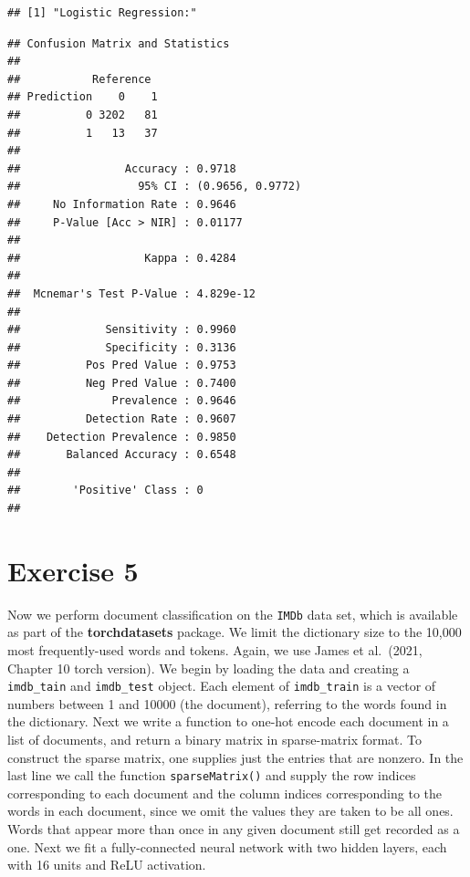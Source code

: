 \documentclass[
]{article}
\begin{document}
\begin{verbatim}
## [1] "Logistic Regression:"
\end{verbatim}

\begin{verbatim}
## Confusion Matrix and Statistics
## 
##           Reference
## Prediction    0    1
##          0 3202   81
##          1   13   37
##                                           
##                Accuracy : 0.9718          
##                  95% CI : (0.9656, 0.9772)
##     No Information Rate : 0.9646          
##     P-Value [Acc > NIR] : 0.01177         
##                                           
##                   Kappa : 0.4284          
##                                           
##  Mcnemar's Test P-Value : 4.829e-12       
##                                           
##             Sensitivity : 0.9960          
##             Specificity : 0.3136          
##          Pos Pred Value : 0.9753          
##          Neg Pred Value : 0.7400          
##              Prevalence : 0.9646          
##          Detection Rate : 0.9607          
##    Detection Prevalence : 0.9850          
##       Balanced Accuracy : 0.6548          
##                                           
##        'Positive' Class : 0               
## 
\end{verbatim}

\newpage

\section{Exercise 5}\label{exercise-5}

Now we perform document classification on the \texttt{IMDb} data set,
which is available as part of the \textbf{torchdatasets} package. We
limit the dictionary size to the 10,000 most frequently-used words and
tokens. Again, we use James et al.~(2021, Chapter 10 torch version). We
begin by loading the data and creating a \texttt{imdb\_tain} and
\texttt{imdb\_test} object. Each element of \texttt{imdb\_train} is a
vector of numbers between 1 and 10000 (the document), referring to the
words found in the dictionary. Next we write a function to one-hot
encode each document in a list of documents, and return a binary matrix
in sparse-matrix format. To construct the sparse matrix, one supplies
just the entries that are nonzero. In the last line we call the function
\texttt{sparseMatrix()} and supply the row indices corresponding to each
document and the column indices corresponding to the words in each
document, since we omit the values they are taken to be all ones. Words
that appear more than once in any given document still get recorded as a
one. Next we fit a fully-connected neural network with two hidden
layers, each with 16 units and ReLU activation.
\end{document}
